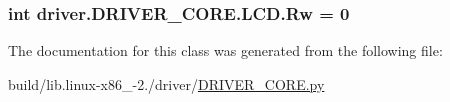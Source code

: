 \subsubsection[{Rw}]{\setlength{\rightskip}{0pt plus 5cm}int driver.\+D\+R\+I\+V\+E\+R\+\_\+\+C\+O\+R\+E.\+L\+C\+D.\+Rw = 0\hspace{0.3cm}{\ttfamily [static]}}\label{classdriver_1_1DRIVER__CORE_1_1LCD_a3d390e26af88fa58f0a5a2071c2dadc4}


The documentation for this class was generated from the following file\+:\begin{DoxyCompactItemize}
\item 
build/lib.\+linux-\/x86\+\_-\/2./driver/\hyperlink{build_2lib_8linux-x86__64-2_87_2driver_2DRIVER__CORE_8py}{D\+R\+I\+V\+E\+R\+\_\+\+C\+O\+R\+E.\+py}\end{DoxyCompactItemize}
